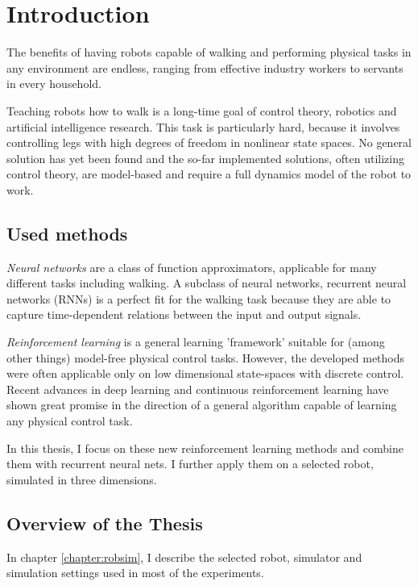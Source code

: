 

\chapter{Introduction}

The benefits of having robots capable of walking and performing physical tasks in any environment are endless, ranging from effective industry workers to servants in every household.

Teaching robots how to walk is a long-time goal of control theory, robotics and artificial intelligence research.
This task is particularly hard, because it involves controlling legs with high degrees of freedom in nonlinear state spaces.
No general solution has yet been found and the so-far implemented solutions, often utilizing control theory, are model-based and require a full dynamics model of the robot to work.

\section{Used methods}

\textit{Neural networks} are a class of function approximators, applicable for many different tasks including walking. A subclass of neural networks, recurrent neural networks (RNNs) is a perfect fit for the walking task because they are able to capture time-dependent relations between the input and output signals.

\textit{Reinforcement learning} is a general learning 'framework' suitable for (among other things) model-free physical control tasks. However, the developed methods were often applicable only on low dimensional state-spaces with discrete control. Recent advances in deep learning and continuous reinforcement learning have shown great promise in the direction of a general algorithm capable of learning any physical control task.

In this thesis, I focus on these new reinforcement learning methods and combine them with recurrent neural nets. I further apply them on a selected robot, simulated in three dimensions.

\section{Overview of the Thesis}
In chapter \ref{chapter:robsim}, I describe the selected robot, simulator and simulation settings used in most of the experiments.

